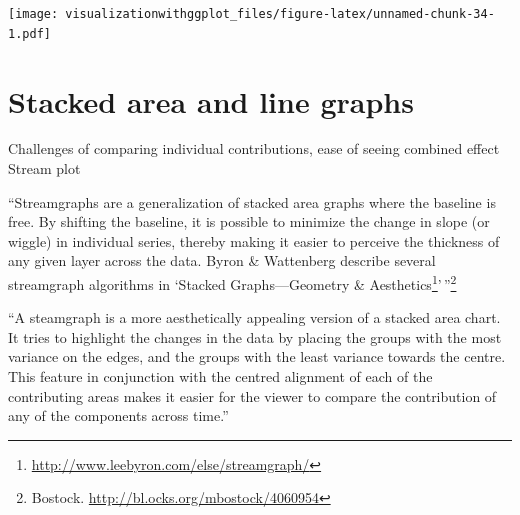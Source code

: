 \documentclass[]{krantz}
\makeatletter
\newenvironment{Shaded}{\begin{snugshade}}{\end{snugshade}}
\newcommand{\KeywordTok}[1]{\textcolor[rgb]{0.13,0.29,0.53}{\textbf{#1}}}
\newcommand{\DataTypeTok}[1]{\textcolor[rgb]{0.13,0.29,0.53}{#1}}
\newcommand{\DecValTok}[1]{\textcolor[rgb]{0.00,0.00,0.81}{#1}}
\newcommand{\StringTok}[1]{\textcolor[rgb]{0.31,0.60,0.02}{#1}}
\newcommand{\CommentTok}[1]{\textcolor[rgb]{0.56,0.35,0.01}{\textit{#1}}}
\newcommand{\OperatorTok}[1]{\textcolor[rgb]{0.81,0.36,0.00}{\textbf{#1}}}
\newcommand{\NormalTok}[1]{#1}
\newenvironment{kframe}{%
\medskip{}
\setlength{\fboxsep}{.8em}
 \def\at@end@of@kframe{}%
 \ifinner\ifhmode%
  \def\at@end@of@kframe{\end{minipage}}%
  \begin{minipage}{\columnwidth}%
 \fi\fi%
 \def\FrameCommand##1{\hskip\@totalleftmargin \hskip-\fboxsep
 \colorbox{shadecolor}{##1}\hskip-\fboxsep
     \hskip-\linewidth \hskip-\@totalleftmargin \hskip\columnwidth}%
 \MakeFramed {\advance\hsize-\width
   \@totalleftmargin\z@ \linewidth\hsize
   \@setminipage}}%
 {\par\unskip\endMakeFramed%
 \at@end@of@kframe}
\renewenvironment{Shaded}{\begin{kframe}}{\end{kframe}}
\theoremstyle{definition}
\theoremstyle{definition}
\theoremstyle{definition}
\theoremstyle{remark}
\makeatother
\begin{document}
\texttt{[image: visualizationwithggplot\_files/figure-latex/unnamed-chunk-34-1.pdf]}

\section{Stacked area and line
graphs}\label{stacked-area-and-line-graphs}

Challenges of comparing individual contributions, ease of seeing
combined effect Stream plot

``Streamgraphs are a generalization of stacked area graphs where the
baseline is free. By shifting the baseline, it is possible to minimize
the change in slope (or wiggle) in individual series, thereby making it
easier to perceive the thickness of any given layer across the data.
Byron \& Wattenberg describe several streamgraph algorithms in `Stacked
Graphs---Geometry \& Aesthetics\footnote{\url{http://www.leebyron.com/else/streamgraph/}}'\,''\footnote{Bostock.
  \url{http://bl.ocks.org/mbostock/4060954}}

``A steamgraph is a more aesthetically appealing version of a stacked
area chart. It tries to highlight the changes in the data by placing the
groups with the most variance on the edges, and the groups with the
least variance towards the centre. This feature in conjunction with the
centred alignment of each of the contributing areas makes it easier for
the viewer to compare the contribution of any of the components across
time.''

\begin{Shaded}
\end{Shaded}
\end{document}
